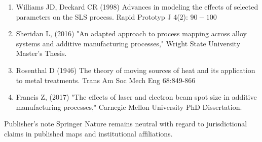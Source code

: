 \documentclass[10pt]{article}
\begin{document}
\begin{enumerate}
  \item Williams JD, Deckard CR (1998) Advances in modeling the effects of selected parameters on the SLS process. Rapid Prototyp J 4(2): $90-100$

  \item Sheridan L, (2016) "An adapted approach to process mapping across alloy systems and additive manufacturing processes," Wright State University Master's Thesis.

  \item Rosenthal D (1946) The theory of moving sources of heat and its application to metal treatments. Trans Am Soc Mech Eng 68:849-866

  \item Francis Z, (2017) "The effects of laser and electron beam spot size in additive manufacturing processes," Carnegie Mellon University PhD Dissertation.

\end{enumerate}

Publisher's note Springer Nature remains neutral with regard to jurisdictional claims in published maps and institutional affiliations.
\end{document}

